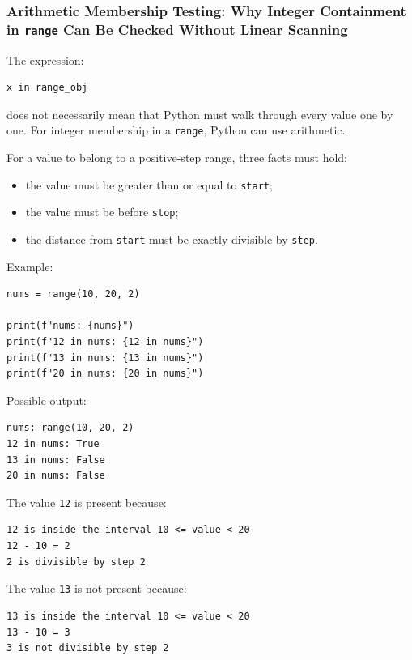 \subsubsection{Arithmetic Membership Testing: Why Integer Containment in \texttt{range} Can Be Checked Without Linear Scanning}

The expression:

\begin{verbatim}
x in range_obj
\end{verbatim}

does not necessarily mean that Python must walk through every value one by one. For integer membership in a \texttt{range}, Python can use arithmetic.

For a value to belong to a positive-step range, three facts must hold:

\begin{itemize}
    \item the value must be greater than or equal to \texttt{start};
    \item the value must be before \texttt{stop};
    \item the distance from \texttt{start} must be exactly divisible by \texttt{step}.
\end{itemize}

Example:

\begin{verbatim}
nums = range(10, 20, 2)

print(f"nums: {nums}")
print(f"12 in nums: {12 in nums}")
print(f"13 in nums: {13 in nums}")
print(f"20 in nums: {20 in nums}")
\end{verbatim}

Possible output:

\begin{verbatim}
nums: range(10, 20, 2)
12 in nums: True
13 in nums: False
20 in nums: False
\end{verbatim}

The value \texttt{12} is present because:

\begin{verbatim}
12 is inside the interval 10 <= value < 20
12 - 10 = 2
2 is divisible by step 2
\end{verbatim}

The value \texttt{13} is not present because:

\begin{verbatim}
13 is inside the interval 10 <= value < 20
13 - 10 = 3
3 is not divisible by step 2
\end{verbatim}

